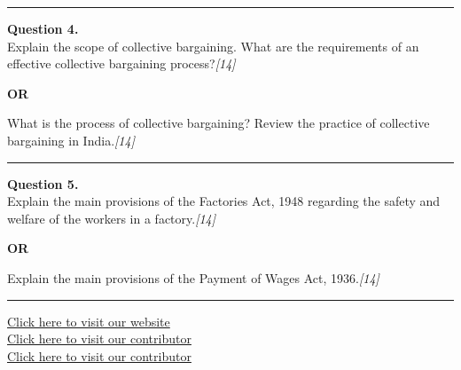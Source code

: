 \documentclass[11pt,a4paper]{article}
\newcommand{\pts}[1]{\hfill   \textit{[#1]}}
\begin{document}
\medskip\rule{\linewidth}{0.2pt}

\pagebreak




\noindent   \textbf{Question 4.} \\
Explain the scope of collective bargaining. What are the requirements of an effective collective bargaining process?\pts{14}

\centerline{   \textbf{OR}}

What is the process of collective bargaining? Review the practice of collective bargaining in India.\pts{14}

\medskip\rule{\linewidth}{0.2pt}




\noindent   \textbf{Question 5.} \\
Explain the main provisions of the Factories Act, 1948 regarding the safety and welfare of the workers in a factory.\pts{14}

\centerline{   \textbf{OR}}

Explain the main provisions of the Payment of Wages Act, 1936.\pts{14}

\vfill
\rule{\linewidth}{0.4pt}

\begin{center}\small
\href{https://bhu-exam.vercel.app/}{Click here to visit our website}\\[4pt]
\href{https://me-aryan.vercel.app/}{Click here to visit our contributor}\\[4pt]
\href{https://quashan-me.vercel.app/}{Click here to visit our contributor}
\end{center}
\end{document}
